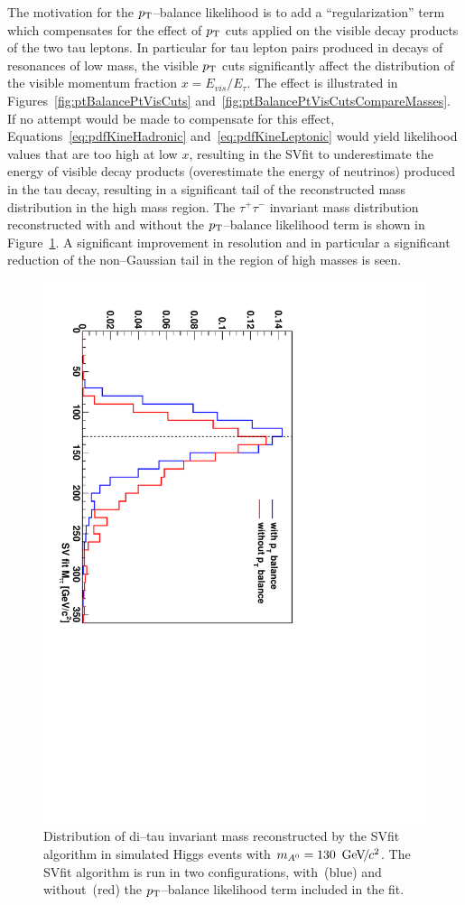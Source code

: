The motivation for the $p_{\mathrm{T}}$--balance likelihood is to add a
``regularization'' term which compensates for the effect of $p_{\mathrm{T}}$ cuts applied
on the visible decay products of the two tau leptons.  In particular for tau
lepton pairs produced in decays of resonances of low mass, the visible $p_{\mathrm{T}}$
cuts significantly affect the distribution of the visible momentum fraction
\mbox{$x = E_{vis}/{E_{\tau}}$}.  The effect is illustrated in
Figures~\ref{fig:ptBalancePtVisCuts}
and~\ref{fig:ptBalancePtVisCutsCompareMasses}.  If no attempt would be made to
compensate for this effect,
Equations~\ref{eq:pdfKineHadronic} and~\ref{eq:pdfKineLeptonic} would yield
likelihood values that are too high at low $x$, resulting in the SVfit to
underestimate the energy of visible decay products (overestimate the energy of
neutrinos) produced in the tau decay, resulting in a significant tail of the
reconstructed mass distribution in the high mass region.  The $\tau^{+}
\tau^{-}$ invariant mass distribution reconstructed with and without the
$p_{\mathrm{T}}$--balance likelihood term is shown in
Figure~\ref{fig:ptBalanceImprovedMassResolution}.  A significant improvement in
resolution and in particular a significant reduction of the non--Gaussian tail
in the region of high masses is seen.

\begin{figure}[t]
\begin{center}
\includegraphics*[height=0.75\textwidth, angle=90]{svfit_chapter/figures/pt_balance_effect.pdf} \caption[Effect of
\pt--balance term on SVfit performance]{\captiontext Distribution of di--tau
invariant mass reconstructed by the SVfit algorithm in simulated Higgs events
with \mbox{$m_{A^0} = 130~{\,\text{Ge\hspace{-.08em}V\hspace{-0.16em}/\hspace{-0.08em}}c^\text{2}}$}.  The SVfit algorithm is run in two
configurations, with~(blue) and without~(red) the $p_{\mathrm{T}}$--balance likelihood term
included in the fit. 
} \label{fig:ptBalanceImprovedMassResolution}
\end{center}
\end{figure} 

